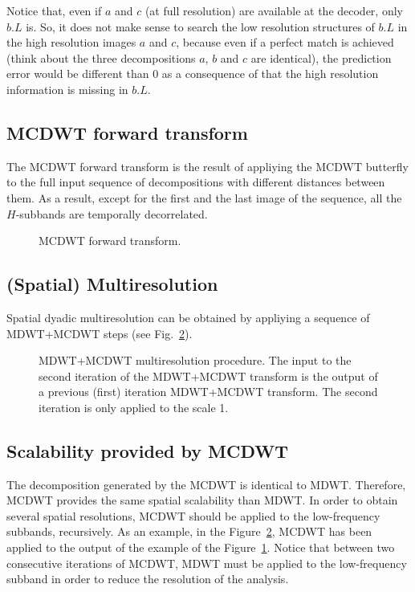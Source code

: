 Notice that, even if $a$ and $c$ (at full resolution) are available at
the decoder, only $b.L$ is. So, it does not make sense to search the
low resolution structures of $b.L$ in the high resolution images $a$
and $c$, because even if a perfect match is achieved (think about the
three decompositions $a$, $b$ and $c$ are identical), the prediction error
would be different than $0$ as a consequence of that the high
resolution information is missing in $b.L$.

\subsection{MCDWT forward transform}

The MCDWT forward transform is the result of appliying the MCDWT
butterfly to the full input sequence of decompositions with different
distances between them. As a result, except for the first and the last
image of the sequence, all the $H$-subbands are temporally
decorrelated.

\begin{figure}
\centering
{}
\caption{MCDWT forward transform.\label{fig:forward_MCDWT}}
\end{figure}


\subsection{(Spatial) Multiresolution}

Spatial dyadic multiresolution can be obtained by appliying a sequence of MDWT+MCDWT steps (see Fig.~\ref{fig:multiresolution}).

\begin{figure}
\centering
{}
\caption{MDWT+MCDWT multiresolution procedure. The input to the second
  iteration of the MDWT+MCDWT transform is the output of a previous
  (first) iteration MDWT+MCDWT transform. The second iteration is only
  applied to the scale 1.\label{fig:multiresolution}}
\end{figure}


\subsection{Scalability provided by MCDWT}
The decomposition generated by the MCDWT is identical to
MDWT. Therefore, MCDWT provides the same spatial scalability than
MDWT. In order to obtain several spatial resolutions, MCDWT should be
applied to the low-frequency subbands, recursively. As an example, in
the Figure~\ref{fig:multiresolution}, MCDWT has been applied to the
output of the example of the Figure~\ref{fig:forward_MCDWT}. Notice
that between two consecutive iterations of MCDWT, MDWT must be applied
to the low-frequency subband in order to reduce the resolution of the
analysis.

